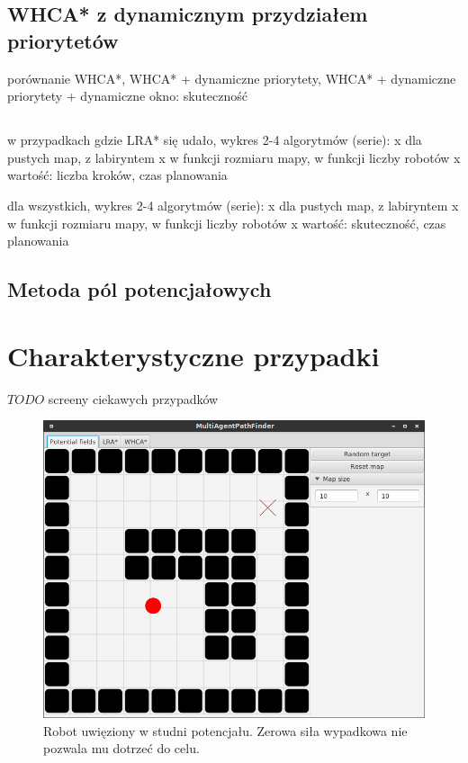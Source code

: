 \subsection{WHCA* z dynamicznym przydziałem priorytetów}
porównanie WHCA*, WHCA* + dynamiczne priorytety, WHCA* + dynamiczne priorytety + dynamiczne okno: skuteczność

\subsection{}
w przypadkach gdzie LRA* się udało, wykres 2-4 algorytmów (serie):
	x dla pustych map, z labiryntem
	x w funkcji rozmiaru mapy, w funkcji liczby robotów
	x wartość: liczba kroków, czas planowania

dla wszystkich, wykres 2-4 algorytmów (serie):
	x dla pustych map, z labiryntem
	x w funkcji rozmiaru mapy, w funkcji liczby robotów
	x wartość: skuteczność, czas planowania

\subsection{Metoda pól potencjałowych}


\section{Charakterystyczne przypadki}
$TODO$ screeny ciekawych przypadków

\begin{figure}
	\centering
	\includegraphics[width=0.8\columnwidth]{img/robopath/field-potential-hole}
	\caption{Robot uwięziony w studni potencjału. Zerowa siła wypadkowa nie pozwala mu dotrzeć do celu.}
	\label{fig:test-field-potential-hole}
\end{figure}

